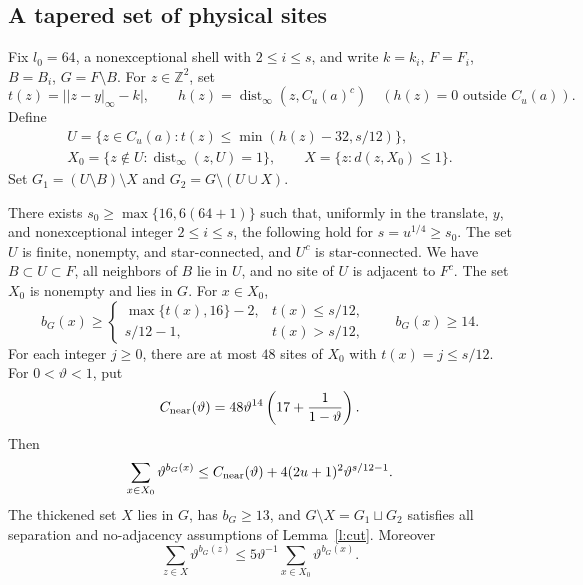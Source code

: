 \subsection{A tapered set of physical sites}\label{s:cutgeom}

\begin{definition}\label{d:thickcut}
Fix \(l_0=64\), a nonexceptional shell with \(2\le i\le s\),
and write \(k=k_i\), \(F=F_i\), \(B=B_i\), \(G=F\setminus B\).
For \(z\in\mathbb Z^2\), set
\[
 t(z)=\big||z-y|_\infty-k\big|,\qquad
 h(z)=\operatorname{dist}_\infty(z,C_u(a)^c)\quad
        (h(z)=0\text{ outside }C_u(a)).
\]
Define
\[
 \begin{gathered}
 U=\{z\in C_u(a):t(z)\le\min(h(z)-32,s/12)\},\\
 X_0=\{z\notin U:\operatorname{dist}_\infty(z,U)=1\},\qquad
 X=\{z:d(z,X_0)\le1\}.
 \end{gathered}
\]
Set \(G_1=(U\setminus B)\setminus X\) and
\(G_2=G\setminus(U\cup X)\).
\end{definition}

\begin{lemma}\label{l:cutgeom}
There exists \(s_0\ge\max\{16,6(64+1)\}\) such that, uniformly
in the translate, \(y\), and nonexceptional integer \(2\le i\le s\),
the following hold for \(s=u^{1/4}\ge s_0\).
The set \(U\) is finite, nonempty, and star-connected, and \(U^c\)
is star-connected. We have \(B\subset U\subset F\), all neighbors
of \(B\) lie in \(U\), and no site of \(U\) is adjacent to \(F^c\).
The set \(X_0\) is nonempty and lies in \(G\). For \(x\in X_0\),
\[
 b_G(x)\ge
 \begin{cases}\max\{t(x),16\}-2,&t(x)\le s/12,\\s/12-1,&t(x)>s/12,
 \end{cases}
 \qquad b_G(x)\ge14 .
\]
For each integer \(j\ge0\), there are at most \(48\) sites of
\(X_0\) with \(t(x)=j\le s/12\).
For \(0<\vartheta<1\), put
\[
 C_{\rm near}(\vartheta)=48\vartheta^{14}
                \left(17+\frac1{1-\vartheta}\right).
\]
Then
\[
 \sum_{x\in X_0}\vartheta^{b_G(x)}
 \le C_{\rm near}(\vartheta)
                 +4(2u+1)^2\vartheta^{s/12-1}.
\]
The thickened set \(X\) lies in \(G\), has \(b_G\ge13\), and
\(G\setminus X=G_1\sqcup G_2\) satisfies all separation and
no-adjacency assumptions of Lemma~\ref{l:cut}. Moreover
\[
 \sum_{z\in X}\vartheta^{b_G(z)}
       \le5\vartheta^{-1}\sum_{x\in X_0}\vartheta^{b_G(x)} .
\]
\end{lemma}

